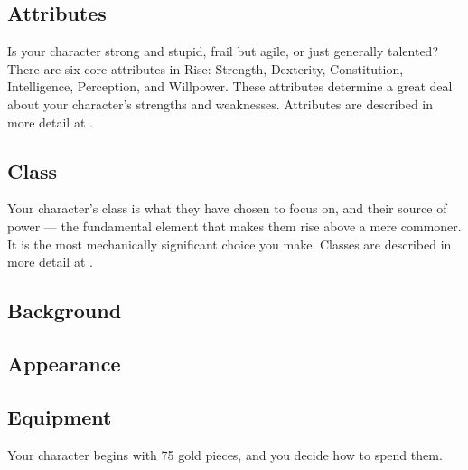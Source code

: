     \subsection{Attributes}
        Is your character strong and stupid, frail but agile, or just generally talented?
        There are six core attributes in Rise: Strength, Dexterity, Constitution, Intelligence, Perception, and Willpower.
        These attributes determine a great deal about your character's strengths and weaknesses.
        Attributes are described in more detail at .

    \subsection{Class}
        Your character's class is what they have chosen to focus on, and their source of power --- the fundamental element that makes them rise above a mere commoner.
        It is the most mechanically significant choice you make.
        Classes are described in more detail at .

    \subsection{Background}

    \subsection{Appearance}

    \subsection{Equipment}
        Your character begins with 75 gold pieces, and you decide how to spend them.
